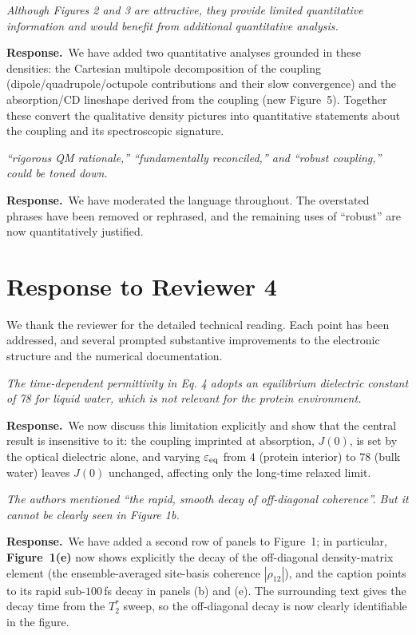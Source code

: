 \documentclass[11pt]{article}
\newcommand{\comment}[1]{\begin{revcomment}\itshape #1\end{revcomment}}
\newcommand{\response}[1]{\noindent\textbf{Response.}\ #1\par\vspace{6pt}}
\begin{document}
\comment{Although Figures 2 and 3 are attractive, they provide limited quantitative
information and would benefit from additional quantitative analysis.}

\response{We have added two quantitative analyses grounded in these densities: the
Cartesian multipole decomposition of the coupling (dipole/quadrupole/octupole
contributions and their slow convergence) and the absorption/CD lineshape derived from
the coupling (new Figure~5). Together these convert the qualitative density pictures into quantitative
statements about the coupling and its spectroscopic signature.}

\comment{``rigorous QM rationale,'' ``fundamentally reconciled,'' and ``robust
coupling,'' could be toned down.}

\response{We have moderated the language throughout. The overstated phrases have been
removed or rephrased, and the remaining uses of ``robust'' are now quantitatively
justified.}

\newpage
\section*{Response to Reviewer 4}

We thank the reviewer for the detailed technical reading. Each point has been
addressed, and several prompted substantive improvements to the electronic structure
and the numerical documentation.

\comment{The time-dependent permittivity in Eq. 4 adopts an equilibrium dielectric
constant of 78 for liquid water, which is not relevant for the protein environment.}

\response{We now discuss this limitation explicitly and show that the central result is
insensitive to it: the coupling imprinted at absorption, $J(0)$, is set by the optical
dielectric alone, and varying $\varepsilon_{\rm eq}$ from $4$ (protein interior) to
$78$ (bulk water) leaves $J(0)$ unchanged, affecting only the long-time relaxed limit.}

\comment{The authors mentioned ``the rapid, smooth decay of off-diagonal coherence''.
But it cannot be clearly seen in Figure 1b.}

\response{We have added a second row of panels to Figure~1; in particular,
\textbf{Figure~1(e)} now shows explicitly the decay of the off-diagonal density-matrix
element (the ensemble-averaged site-basis coherence $|\rho_{12}|$), and the caption points
to its rapid sub-$100$\,fs decay in panels (b) and (e). The surrounding text gives the
decay time from the $T_2^{*}$ sweep, so the off-diagonal decay is now clearly identifiable
in the figure.}
\end{document}
